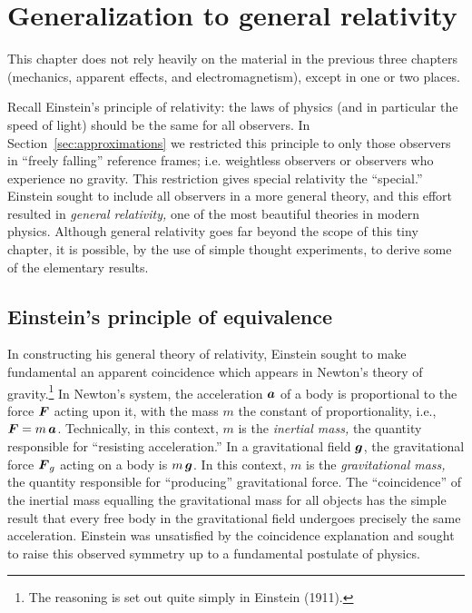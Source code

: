 \chapter{Generalization to general relativity}
\label{chap:general}

This chapter does not rely heavily on the material in the previous
three chapters (mechanics, apparent effects, and electromagnetism),
except in one or two places.

Recall Einstein's principle of relativity: the laws of physics (and in
particular the speed of light) should be the same for all observers.
In Section~\ref{sec:approximations} we restricted this principle to
only those observers in ``freely falling'' reference frames;
i.e. weightless observers or observers who experience no gravity.
This restriction gives special relativity the ``special.''  Einstein
sought to include all observers in a more general theory, and this
effort resulted in {\em general relativity,\/} one of the most
beautiful theories in modern physics.  Although general relativity
goes far beyond the scope of this tiny chapter, it is possible, by the
use of simple thought experiments, to derive some of the elementary
results.


\section{Einstein's principle of equivalence}

In constructing his general theory of relativity, Einstein sought to
make fundamental an apparent coincidence which appears in Newton's
theory of gravity.\footnote{The reasoning is set out quite simply in
Einstein (1911).}  In Newton's system, the acceleration $\mbox{\boldmath $a$}$ of a
body is proportional to the force $\mbox{\boldmath $F$}$ acting upon it, with the
mass $m$ the constant of proportionality, i.e., $\mbox{\boldmath $F$}=m\,\mbox{\boldmath $a$}$.
Technically, in this context, $m$ is the {\em inertial mass,\/} the
quantity responsible for ``resisting acceleration.''  In a
gravitational field $\mbox{\boldmath $g$}$, the gravitational force $\mbox{\boldmath $F$}_g$
acting on a body is $m\,\mbox{\boldmath $g$}$.  In this context, $m$ is the {\em
gravitational mass,\/} the quantity responsible for ``producing''
gravitational force.  The ``coincidence'' of the inertial mass
equalling the gravitational mass for all objects has the simple result
that every free body in the gravitational field undergoes precisely
the same acceleration.  Einstein was unsatisfied by the coincidence
explanation and sought to raise this observed symmetry up to a
fundamental postulate of physics.

